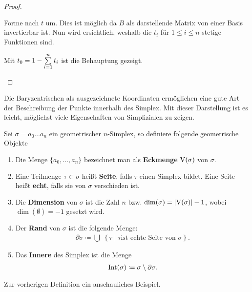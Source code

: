 \begin{Lem}
\begin{proof}
\begin{description}
      Forme nach $t$ um. Dies ist möglich da $B$ als darstellende
      Matrix von einer Basis invertierbar ist. Nun wird ersichtlich,
      weshalb die $t_i$ für $1 \leq i \leq n$ stetige Funktionen sind.

      \pagebreak

      Mit $t_0 = 1 - \sp{1}{n} t_i$ ist die Behauptung gezeigt.
    \end{description}
  \end{proof}
\end{Lem}

Die Baryzentrischen als ausgezeichnete Koordinaten ermöglichen eine
gute Art der Beschreibung der Punkte innerhalb des Simplex. Mit dieser
Darstellung ist es leicht, möglichst viele Eigenschaften von Simplizialen
zu zeigen.

\begin{Def}
  Sei $\sigma = a_0 \ldots a_n$ ein geometrischer $n$-Simplex, so
  definiere folgende geometrische Objekte
  \begin{enumerate}[\textbullet]%
  \item Die Menge $\{ a_0 , \ldots , a_n \}$ bezeichnet man als
    \textbf{Eckmenge} $\V(\sigma)$ von $\sigma$.
  \item Eine Teilmenge $\tau \subset \sigma$ heißt \textbf{Seite},
    falls $\tau$ einen Simplex bildet. Eine Seite heißt \textbf{echt},
    falls sie von $\sigma$ verschieden ist.
  \item Die \textbf{Dimension} von $\sigma$ ist die Zahl $n$ bzw.
    $\dim(\sigma) = \gr{\V(\sigma)} - 1$, wobei $\dim(\emptyset)=-1$
    gesetzt wird.
  \item Der \textbf{Rand} von $\sigma$ ist die folgende Menge:
    \begin{gather*}
      \partial\sigma \coloneqq \bigcup \; \left\{ \tau \; \Big| \; \tau \text{
          ist echte Seite von } \sigma \right\}.
    \end{gather*}
  \item Das \textbf{Innere} des Simplex ist die Menge
    \begin{gather*}
    	\Int(\sigma) \coloneqq \sigma \setminus \partial\sigma.
    \end{gather*}
  \end{enumerate}
\end{Def}

Zur vorherigen Definition ein anschauliches Beispiel.

